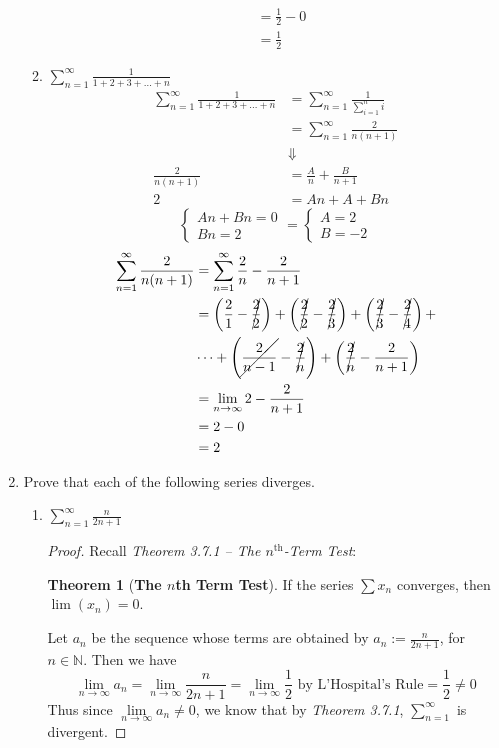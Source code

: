 \documentclass[12pt,letterpaper]{article}
\newcommand{\limx}[2]{\displaystyle\lim\limits_{#1 \to #2}}
\newcommand{\N}{\mathbb{N}}
\theoremstyle{case}
\theoremstyle{definition}
\newtheorem*{theorem*}{Theorem}
\begin{document}
\begin{enumerate}
\begin{enumerate}
\begin{align*}
				&= \frac{1}{2} - 0 \\
				&= \frac{1}{2}
			\end{align*}
			\item $\displaystyle\sum_{n=1}^{\infty} \frac{1}{1+2+3+\dots+n}$
			\begin{align*}
				\sum_{n=1}^{\infty} \frac{1}{1+2+3+\dots+n} &= \sum_{n=1}^{\infty} \frac{1}{\sum\limits_{i=1}^{n} i} \\
				&= \sum_{n=1}^{\infty} \frac{2}{n(n+1)} \\
				&\Downarrow \\
				\frac{2}{n(n+1)} &= \frac{A}{n} + \frac{B}{n+1} \\
				2&=An+A+Bn
			\end{align*}
			\[\begin{cases}
			An+Bn=0 \\
			Bn=2
			\end{cases}=\begin{cases}
			A=2 \\
			B=-2
			\end{cases}\]
			\begin{align*}
				\sum_{n=1}^{\infty} \frac{2}{n(n+1)} &= \sum_{n=1}^{\infty} \frac{2}{n}-\frac{2}{n+1} \\
				&= \left(\frac{2}{1}-\cancel{\frac{2}{2}}\right) + \left(\cancel{\frac{2}{2}}-\cancel{\frac{2}{3}}\right) + \left(\cancel{\frac{2}{3}}-\cancel{\frac{2}{4}}\right) + \\
				&\dots + \left(\cancel{\frac{2}{n-1}}-\cancel{\frac{2}{n}}\right) + \left(\cancel{\frac{2}{n}}-\frac{2}{n+1}\right) \\
				&= \limx{n}{\infty} 2-\frac{2}{n+1} \\
				&= 2-0 \\
				&= 2
			\end{align*}
		\end{enumerate}
		\item Prove that each of the following series diverges.
		\begin{enumerate}
			\item $\displaystyle\sum_{n=1}^{\infty} \frac{n}{2n+1}$
			\begin{proof}
				Recall \textit{Theorem 3.7.1 -- The $n^{\text{th}}$-Term Test}: 
				\begin{theorem*}[\textbf{The $n$th Term Test}]
					If the series $\sum x_n$ converges, then $\lim (x_n) = 0$.
				\end{theorem*}
				Let $a_n$ be the sequence whose terms are obtained by $a_n:=\frac{n}{2n+1}$, for $n \in \N$. Then we have 
				\[\limx{n}{\infty} a_n = \limx{n}{\infty} \frac{n}{2n+1} = \limx{n}{\infty} \frac{1}{2} \text{ by L'Hospital's Rule} = \frac{1}{2} \neq 0\]
				Thus since $\limx{n}{\infty} a_n \neq 0$, we know that by \textit{Theorem 3.7.1}, $\displaystyle\sum_{n=1}^{\infty}$ is divergent.
			\end{proof}
		

\end{enumerate}
\end{enumerate}
\end{document}
